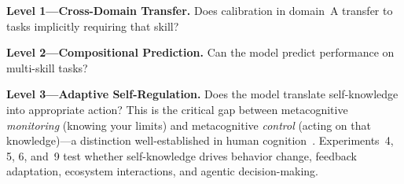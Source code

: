 \documentclass[10pt]{article}
\begin{document}
\textbf{Level 1---Cross-Domain Transfer.}
Does calibration in domain~A transfer to tasks implicitly requiring that skill?

\textbf{Level 2---Compositional Prediction.}
Can the model predict performance on multi-skill tasks?

\textbf{Level 3---Adaptive Self-Regulation.}
Does the model translate self-knowledge into appropriate action? This is the
critical gap between metacognitive \textit{monitoring} (knowing your limits) and
metacognitive \textit{control} (acting on that knowledge)---a distinction
well-established in human cognition~\citep{metcalfe2008metacognitive}.
Experiments~4, 5, 6, and~9 test whether self-knowledge drives behavior change,
feedback adaptation, ecosystem interactions, and agentic decision-making.

\end{document}
